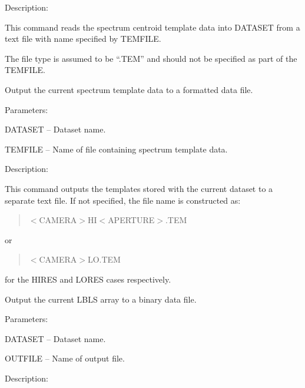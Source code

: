 \begin {description}
\begin {description}
\item Description:

This command reads the spectrum centroid template data into DATASET from 
a text file with name specified by TEMFILE.

The file type is assumed to be ``.TEM'' and should not be specified
as part of the TEMFILE.
\end {description}

\item [OUTEM]
Output the current spectrum template data to a formatted data file.

\begin {description}
\item Parameters:

\begin {description}
\item DATASET -- Dataset name.
\item TEMFILE -- Name of file containing spectrum template data.
\end {description}

\item Description:

This command outputs the templates stored with the current
dataset to a separate text file. 
If not specified, the file name is constructed as:

\begin {quote}
$<$CAMERA$>$HI$<$APERTURE$>$.TEM
\end {quote}
or

\begin {quote}
$<$CAMERA$>$LO.TEM
\end {quote}

for the HIRES and LORES cases respectively.
\end {description}

\item [OUTLBLS]
Output the current LBLS array to a binary data file.

\begin {description}
\item Parameters:

\begin {description}
\item DATASET -- Dataset name.
\item OUTFILE -- Name of output file.
\end {description}

\item Description:


\end{description}
\end{description}
